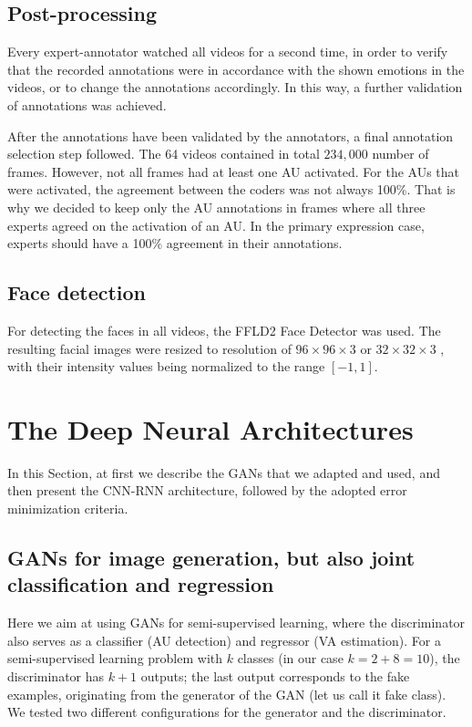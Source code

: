 \documentclass[a4paper, 10pt, conference]{ieeeconf}      %
\begin{document}
\subsection{Post-processing}

Every expert-annotator watched all videos for a second
time, in order to verify that the recorded annotations
were in accordance with the shown emotions in the videos,
or to change the annotations accordingly. In this way, a further
validation of annotations was achieved.

After the annotations have been validated by the annotators,
a final annotation selection step followed.
The 64 videos contained in total $234,000$ number of frames. However, not all frames had at least one AU activated. For the AUs that were activated, the agreement between the coders was not always 100\%. That is why we decided to keep only the AU annotations in frames where all three experts agreed on the activation of an AU. In the primary expression case, experts should have a 100\% agreement in their annotations.


\subsection{Face detection}

For detecting the faces in all videos, the FFLD2 Face Detector \cite{mathias2014face} was used.
The resulting facial images were resized to resolution of $96 \times 96 \times 3$ or $32 \times 32 \times 3$ , with their
intensity values being normalized to the range $[-1, 1]$.


\section{The Deep Neural Architectures}
 
In this Section, at first we describe the GANs that we adapted and used, and then present the CNN-RNN architecture, followed by the adopted error minimization criteria.

\subsection{GANs for image generation, but also joint classification and regression}\label{gans}


Here we aim at using GANs for semi-supervised learning, where the discriminator also serves as a classifier (AU detection) and regressor (VA estimation). For a semi-supervised learning problem with $k$ classes (in our case $k=2+8=10$), the discriminator has $k+1$ outputs; the last output corresponds to the fake examples, originating from the generator of the GAN (let us call it fake class). We tested two different configurations for the generator and the discriminator.
\end{document}
